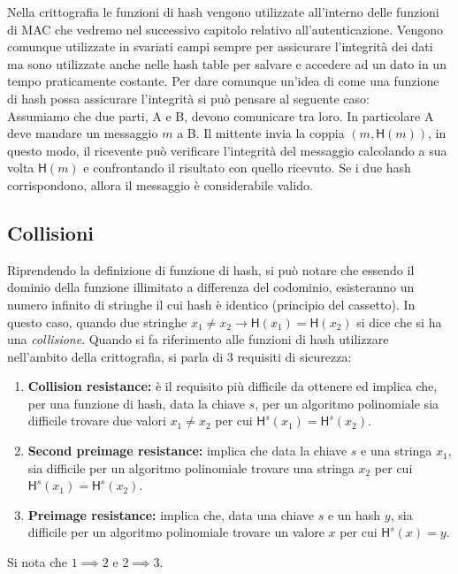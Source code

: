 Nella crittografia le funzioni di hash vengono utilizzate all'interno delle funzioni di MAC che vedremo nel successivo capitolo relativo all'autenticazione.
Vengono comunque utilizzate in svariati campi sempre per assicurare l'integrità dei dati ma sono utilizzate anche nelle hash table per salvare e accedere ad un dato in un tempo praticamente costante.
Per dare comunque un'idea di come una funzione di hash possa assicurare l'integrità si può pensare al seguente caso:\\
Assumiamo che due parti, A e B, devono comunicare tra loro. In particolare A deve mandare un messaggio $m$ a B. Il mittente invia la coppia $(m, \mathsf{H}(m))$, in questo modo, il ricevente può verificare l'integrità del messaggio calcolando a sua volta $\mathsf{H}(m)$ e confrontando il risultato con quello ricevuto. Se i due hash corrispondono, allora il messaggio è considerabile valido.\\

\subsection{Collisioni} %
Riprendendo la definizione di funzione di hash, si può notare che essendo il dominio della funzione illimitato a differenza del codominio, esisteranno un numero infinito di stringhe il cui hash è identico (principio del cassetto).
In questo caso, quando due stringhe $x_1 \neq x_2 \rightarrow \mathsf{H}(x_1) = \mathsf{H}(x_2)$ si dice  che si ha una \emph{collisione}.
Quando si fa riferimento alle funzioni di hash utilizzare nell'ambito della crittografia, si parla di 3 requisiti di sicurezza:
\begin{enumerate}
    \item{\textbf{Collision resistance:} è il requisito più difficile da ottenere ed implica che, per una funzione di hash, data la chiave $s$, per un algoritmo polinomiale sia difficile trovare due valori $x_1 \neq x_2$ per cui $\mathsf{H}^s(x_1) = \mathsf{H}^s(x_2)$.}
    \item{\textbf{Second preimage resistance:} implica che data la chiave $s$ e una stringa $x_1$, sia difficile per un algoritmo polinomiale trovare una stringa $x_2$ per cui $\mathsf{H}^s(x_1) = \mathsf{H}^s(x_2)$}.
    \item{\textbf{Preimage resistance:} implica che, data una chiave $s$ e un hash $y$, sia difficile per un algoritmo polinomiale trovare un valore $x$ per cui $\mathsf{H}^s(x) = y$.}
\end{enumerate}
Si nota che $1 \implies 2$ e $2 \implies 3$.

